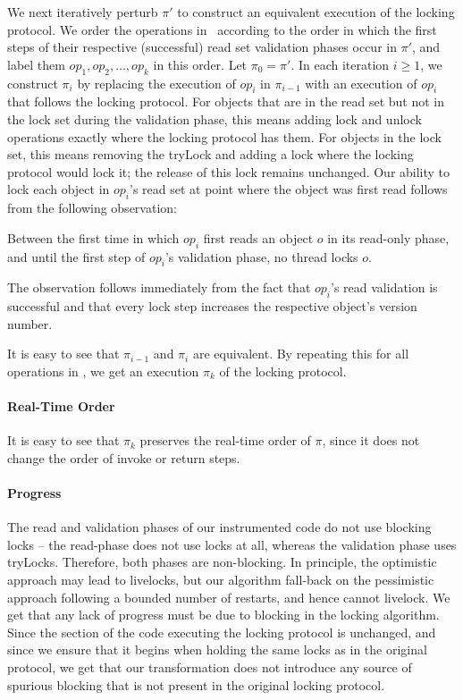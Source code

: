 We next iteratively perturb $\pi'$ to construct an equivalent execution of the locking protocol.
We order the operations in \op\ according to the order in which the first steps of their respective (successful) read set validation phases occur in $\pi'$,
and label them $op_1, op_2, \ldots, op_k$ in this order. Let $\pi_0 = \pi'$. In each iteration $i \geq 1$, we construct $\pi_i$ by replacing the execution of $op_i$
in $\pi_{i-1}$ with an execution of $op_i$ that follows the locking protocol. For objects that are in the read set but not in the lock set during the validation phase, this means adding lock and unlock operations exactly where the locking protocol has them. For objects in the lock set, this means removing the tryLock and adding a lock where the locking protocol would lock it; the release of this lock remains unchanged. 
Our ability to lock each object in $op_i$'s read set at 
point where the object was first read follows from the following observation:
\begin{observation}
Between the first time in which $op_i$ first reads an object $o$ in its read-only phase, and until the first step of $op_i$'s validation phase, no
 thread locks $o$. 
\end{observation}
The observation follows immediately from the fact that $op_i$'s read validation is successful and that every lock step increases the
respective object's version number. 

It is easy to see that $\pi_{i-1}$ and $\pi_i$ are equivalent. By repeating this for all operations in \op, we get an execution $\pi_k$ of the locking 
protocol.

\paragraph{Real-Time Order}
It is easy to see that $\pi_k$ preserves the real-time order of $\pi$, since it does not change the order of invoke or return steps. 

\paragraph{Progress}
The read and validation phases of our instrumented code do not use blocking locks -- the read-phase does not use locks at all, whereas the 
validation phase uses tryLocks. Therefore, both phases are non-blocking. In principle, the optimistic approach may lead to livelocks, but 
our algorithm fall-back on the pessimistic approach following a bounded number of restarts, and hence cannot livelock. We get that any lack
of progress must be due to blocking in the locking algorithm. Since the section of the code executing the locking protocol is unchanged, and
since we ensure that it begins when holding the same locks as in the original protocol, we get that our transformation does not introduce any
source of spurious blocking that is not present in the original locking protocol. 


